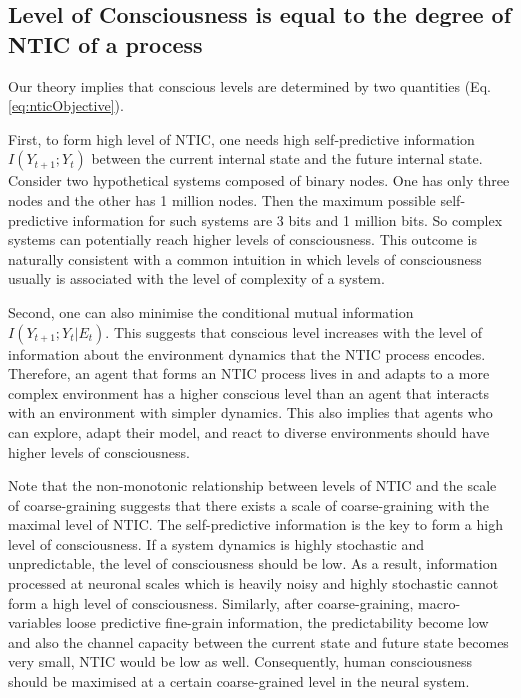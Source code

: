 \documentclass[utf8]{article}
\begin{document}
	    \subsection{Level of Consciousness is equal to the degree of NTIC of a process}
	    
	    Our theory implies that conscious levels are determined by two quantities (Eq. \ref{eq:nticObjective}). 
	    
	    First, to form high level of NTIC, one needs high self-predictive information $I(Y_{t+1};Y_{t})$ between the current internal state and the future internal state. 
	    Consider two hypothetical systems composed of binary nodes. One has only three nodes and the other has 1 million nodes. Then the maximum possible self-predictive information for such systems are 3 bits and 1 million bits. So complex systems can potentially reach higher levels of consciousness.
	    This outcome is naturally consistent with a common intuition in which levels of consciousness usually is associated with the level of complexity of a system.

	    Second, one can also minimise the conditional mutual information  $I(Y_{t+1};Y_{t}|E_{t})$. This suggests that conscious level increases with the level of information about the environment dynamics that the NTIC process encodes. Therefore, an agent that forms an NTIC process lives in and adapts to a more complex environment has a higher conscious level than an agent that interacts with an environment with simpler dynamics. This also implies that agents who can explore, adapt their model, and react to diverse environments should have higher levels of consciousness. 
	    
	    Note that the non-monotonic relationship between levels of NTIC and the scale of coarse-graining suggests that there exists a scale of coarse-graining with the maximal level of NTIC. The self-predictive information is the key to form a high level of consciousness. If a system dynamics is highly stochastic and unpredictable, the level of consciousness should be low. As a result, information processed at neuronal scales which is heavily noisy and highly stochastic cannot form a high level of consciousness. Similarly, after coarse-graining, macro-variables loose predictive fine-grain information, the predictability become low and also the channel capacity between the current state and future state becomes very small, NTIC would be low as well. Consequently, human consciousness should be maximised at a certain coarse-grained level in the neural system. 
	    
\end{document}
